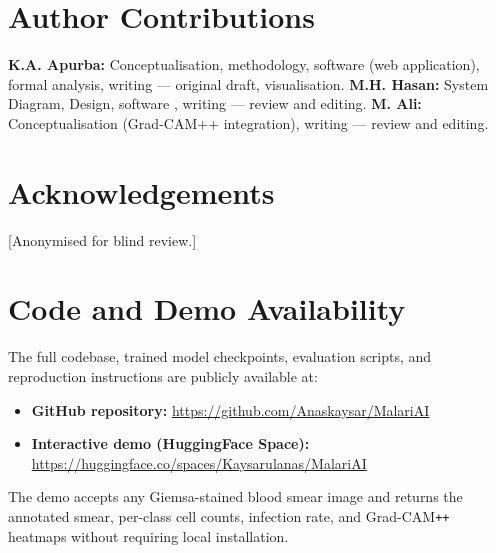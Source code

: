 \documentclass[review,12pt]{elsarticle}
\begin{document}
\section*{Author Contributions}

\textbf{K.A. Apurba:} Conceptualisation, methodology, software (web
application), formal
analysis, writing --- original draft, visualisation.
\textbf{M.H. Hasan:} System Diagram, Design, software , writing --- review and editing.
\textbf{M. Ali:} Conceptualisation (Grad-CAM++ integration), writing ---
review and editing.

\section*{Acknowledgements}

[Anonymised for blind review.]

\section*{Code and Demo Availability}

The full codebase, trained model checkpoints, evaluation scripts, and
reproduction instructions are publicly available at:
\begin{itemize}
  \item \textbf{GitHub repository:} \url{https://github.com/Anaskaysar/MalariAI}
  \item \textbf{Interactive demo (HuggingFace Space):} \url{https://huggingface.co/spaces/Kaysarulanas/MalariAI}
\end{itemize}
The demo accepts any Giemsa-stained blood smear image and returns the annotated
smear, per-class cell counts, infection rate, and Grad-CAM\texttt{++} heatmaps
without requiring local installation.




\appendix
\end{document}
